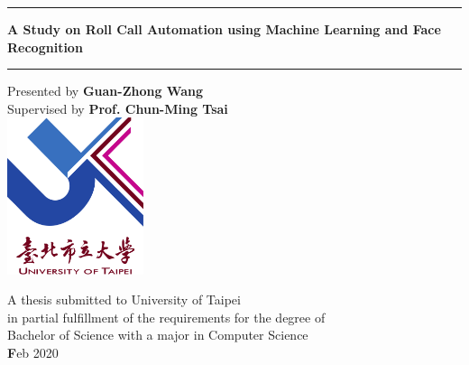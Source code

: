 \def\title{A Study on Roll Call Automation using Machine Learning and Face Recognition}
\def\author{Guan-Zhong Wang}
\def\supervisor{Prof. Chun-Ming Tsai}
\def\date{Feb 2020}

\begin{titlepage}
  \begin{center}
    \vspace*{1cm}

    \noindent\rule{16cm}{1.5pt}

    \vspace*{0.5cm}
    \textbf{\huge \title}
    \vspace*{0.5cm}
    \noindent\rule{16cm}{1.5pt}

    \vspace{0.5cm}
    {\large Presented by} \textbf{\Large \author}\\
    \vspace{0.3cm}
    {\large Supervised by} \textbf{\Large \supervisor}\\

    \vspace{2.0cm}
    \includegraphics[width=0.3\textwidth]{figures/utaipei.png}
    \vspace{1.5cm}

    \vfill

    {\Large A thesis submitted to University of Taipei\\
      in partial fulfillment of the requirements for the degree of\\
      Bachelor of Science with a major in Computer Science\\
    }
    \vspace{1.2cm}
    {\Large \textbf\date}

    \vspace{3.5cm}

  \end{center}
\end{titlepage}
